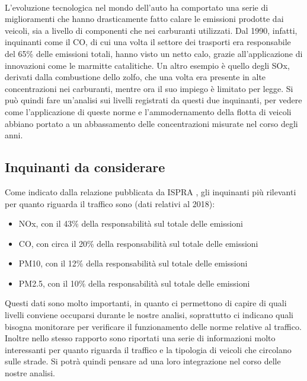 \documentclass{article}
\begin{document}
\\L'evoluzione tecnologica nel mondo dell'auto ha comportato una serie di miglioramenti che hanno drasticamente fatto calare le emissioni prodotte dai veicoli, sia a livello di componenti che nei carburanti utilizzati. Dal 1990, infatti, inquinanti come il CO, di cui una volta il settore dei trasporti era responsabile del 65\% delle emissioni totali, hanno visto un netto calo, grazie all'applicazione di innovazioni come le marmitte catalitiche. Un altro esempio è quello degli SOx, derivati dalla combustione dello zolfo, che una volta era presente in alte concentrazioni nei carburanti, mentre ora il suo impiego è limitato per legge. Si può quindi fare un'analisi sui livelli registrati da questi due inquinanti, per vedere come l'applicazione di queste norme e l'ammodernamento della flotta di veicoli abbiano portato a un abbassamento delle concentrazioni misurate nel corso degli anni.

\subsection{Inquinanti da considerare}
Come indicato dalla relazione pubblicata da ISPRA \cite{iir2020}, gli inquinanti più rilevanti per quanto riguarda il traffico sono (dati relativi al 2018): 
\begin{itemize}
	\item NOx, con il 43\% della responsabilità sul totale delle emissioni
	\item CO, con circa il 20\% della responsabilità sul totale delle emissioni
	\item PM10, con il 12\% della responsabilità sul totale delle emissioni
	\item PM2.5, con il 10\% della responsabilità sul totale delle emissioni
\end{itemize}
Questi dati sono molto importanti, in quanto ci permettono di capire di quali livelli conviene occuparsi durante le nostre analisi, soprattutto ci indicano quali bisogna monitorare per verificare il funzionamento delle norme relative al traffico. 
\\Inoltre nello stesso rapporto sono riportati una serie di informazioni molto interessanti per quanto riguarda il traffico e la tipologia di veicoli che circolano sulle strade. Si potrà quindi pensare ad una loro integrazione nel corso delle nostre analisi.
\newpage
\end{document}
